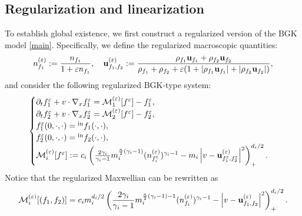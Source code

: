 \documentclass[10pt,reqno]{amsart}
\numberwithin{equation}{section}
\newcommand{\calM}{\mathcal M}
\newcommand{\p}{\partial}
\newcommand{\ve}{\varepsilon}
\begin{document}
\subsection{Regularization and linearization}
To establish global existence, we first construct a regularized version of the BGK model \eqref{main}. Specifically, we define the regularized macroscopic quantities:
\begin{align*}
    n^{(\ve)}_{f_1} := \frac{n_{f_1}}{1+\ve n_{f_1}}, \quad {\bf{u}}^{(\ve)}_{f_1,f_2} := \frac{\rho_{f_1}{\bf{u}}_{f_1} + \rho_{f_2}{\bf{u}}_{f_2}}{\rho_{f_1} + \rho_{f_2} + \ve(1+ |\rho_{f_1}{\bf{u}}_{f_1}| + |\rho_{f_2}{\bf{u}}_{f_2}| )},
\end{align*}
and consider the following regularized BGK-type system:
\begin{align}\label{eq: rbgk}
    \begin{cases}
        \p_t f^{\ve}_1 + v\cdot \nabla_x f^{\ve}_1 = \calM_1^{(\ve)}[f^\ve] - f_1^\ve,\\
        \p_t f^{\ve}_2 + v\cdot \nabla_x f^{\ve}_2 = \calM_2^{(\ve)}[f^\ve] - f_2^\ve,\\
        f^\ve_1(0,\cdot,\cdot) = {}^{\rm in}f_1(\cdot,\cdot), \\
        f^\ve_2(0,\cdot,\cdot) = {}^{\rm in}f_2(\cdot,\cdot),\\
        \calM_i^{(\ve)}[f^\ve] := c_i\left(\frac{2\gamma_i}{\gamma_i - 1} m_i^{\frac{n}{2}(\gamma_i-1)} (n_{f_i^\ve}^{(\ve)})^{\gamma_i-1} - m_i\left|v- {\bf{u}}^{(\ve)}_{f_1^\ve,f_2^\ve} \right|^2 \right)_+^{d_i/2}.
    \end{cases}
\end{align}
Notice that the regularized Maxwellian can be rewritten as
\begin{align*}
    \calM_i^{(\ve)}[(f_1,f_2)] = c_i m_i^{d_i/2} \left(\frac{2\gamma_i}{\gamma_i - 1} m_i^{\frac{n}{2}(\gamma_i - 1) - 1} (n_{f_i}^{(\ve)})^{\gamma_i-1} - \left|v- {\bf{u}}^{(\ve)}_{f_1,f_2}\right|^2 \right)_+^{d_i/2}.
\end{align*}
\end{document}
